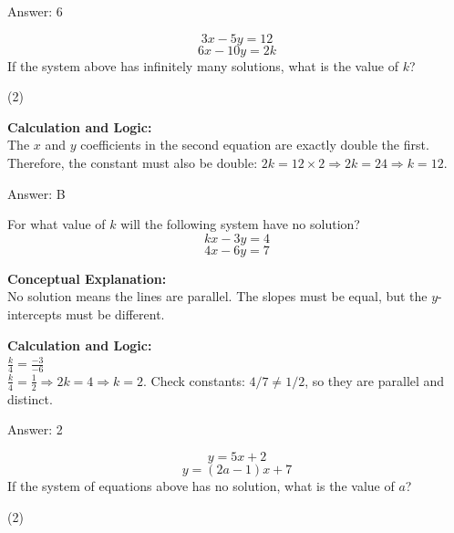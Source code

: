 \documentclass[11pt,paper=a4,answers]{exam}
\begin{document}
\begin{questions}
\begin{solution}
\vspace{15pt}
Answer: \colorbox{yellow!100}{6}
\end{solution}

\question
\[ 3x - 5y = 12 \]
\[ 6x - 10y = 2k \]
If the system above has infinitely many solutions, what is the value of $k$?
\begin{tasks}(2)
\end{tasks}

\begin{solution}
\textbf{Calculation and Logic:} \\
The $x$ and $y$ coefficients in the second equation are exactly double the first. 
Therefore, the constant must also be double: $2k = 12 \times 2 \Rightarrow 2k = 24 \Rightarrow k = 12$.

\vspace{15pt}
Answer: \colorbox{yellow!100}{B}
\end{solution}


\question
For what value of $k$ will the following system have no solution?
\[ kx - 3y = 4 \]
\[ 4x - 6y = 7 \]

\begin{solution}
\textbf{Conceptual Explanation:} \\
No solution means the lines are parallel. The slopes must be equal, but the $y$-intercepts must be different.

\vspace{10pt}
\textbf{Calculation and Logic:} \\
$\frac{k}{4} = \frac{-3}{-6}$ \\
$\frac{k}{4} = \frac{1}{2} \Rightarrow 2k = 4 \Rightarrow k = 2$.
Check constants: $4/7 \neq 1/2$, so they are parallel and distinct.

\vspace{15pt}
Answer: \colorbox{yellow!100}{2}
\end{solution}

\question
\[ y = 5x + 2 \]
\[ y = (2a - 1)x + 7 \]
If the system of equations above has no solution, what is the value of $a$?
\begin{tasks}(2)
\end{tasks}


\end{questions}
\end{document}

